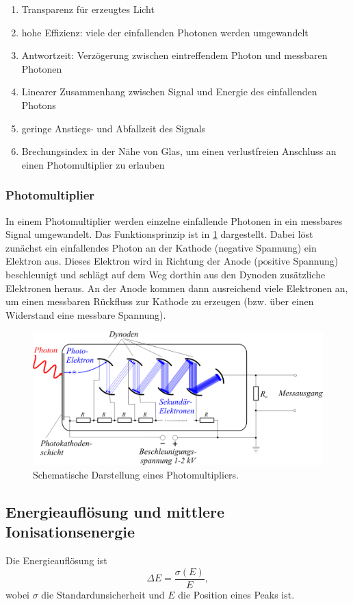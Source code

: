 \documentclass[
	a4paper,
	12pt,
	pagesize,
	ngerman
]{scrartcl}
\begin{document}
	\begin{enumerate}
		\item Transparenz für erzeugtes Licht
		\item hohe Effizienz: viele der einfallenden Photonen werden umgewandelt
		\item Antwortzeit: Verzögerung zwischen eintreffendem Photon und messbaren Photonen
		\item Linearer Zusammenhang zwischen Signal und Energie des einfallenden Photons
		\item geringe Anstiegs- und Abfallzeit des Signals
		\item Brechungsindex in der Nähe von Glas, um einen verlustfreien Anschluss an einen Photomultiplier zu erlauben
	\end{enumerate}

	\subsubsection{Photomultiplier}

	In einem Photomultiplier werden einzelne einfallende Photonen in ein messbares Signal umgewandelt.
	Das Funktionsprinzip ist in \cref{fig_Photomultiplier} dargestellt.
	Dabei löst zunächst ein einfallendes Photon an der Kathode (negative Spannung) ein Elektron aus.
	Dieses Elektron wird in Richtung der Anode (positive Spannung) beschleunigt und schlägt auf dem Weg dorthin aus den Dynoden zusätzliche Elektronen heraus.
	An der Anode kommen dann ausreichend viele Elektronen an, um einen messbaren Rückfluss zur Kathode zu erzeugen (bzw. über einen Widerstand eine messbare Spannung).

	\begin{figure}[H]
			\includegraphics[width=0.6\linewidth]{charts/Photomultiplier}
			\caption{
			Schematische Darstellung eines Photomultipliers.
			\cite{Photomultiplier}
			}
			\label{fig_Photomultiplier}
	\end{figure}

	\subsection{Energieauflösung und mittlere Ionisationsenergie}
	Die Energieauflösung ist
	\begin{equation}
		\Delta E = \frac{\sigma(E)}{E},
	\end{equation}
	wobei $\sigma$ die Standardunsicherheit und $E$ die Position eines Peaks ist.
\end{document}
